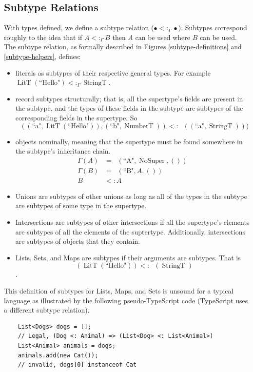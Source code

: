 \documentclass[12pt]{article}
\DeclareMathOperator{\StringT}{StringT}
\DeclareMathOperator{\NumberT}{NumberT}
\DeclareMathOperator{\LitT}{LitT}
\DeclareMathOperator{\RecT}{RecT_\Gamma}
\DeclareMathOperator{\ObjT}{ObjT_\Gamma}
\DeclareMathOperator{\ListT}{ListT_\Gamma}
\DeclareMathOperator{\NoSuper}{NoSuper}
\newcommand{\subtype}{<:_\Gamma}
\newcommand{\textq}[1]{\text{``#1"}}
\begin{document}
\subsection{Subtype Relations}

With types defined, we define a subtype 
relation (\(\bullet\subtype\bullet\)). Subtypes correspond 
roughly to the idea that if \(A\subtype B\) then \(A\)
can be used where \(B\) can be used. The subtype relation,
as formally described in Figures \ref{subtype-definitions} and \ref{subtype-helpers}, 
defines: 
\begin{itemize}
    \item literals as subtypes of their respective general types.
For example \(\LitT(\text{``Hello"})\subtype\StringT\). 
    \item record subtypes structurally; that is, all the supertype's fields 
are present in the subtype, and the types of these fields in the subtype
are subtypes of the corresponding fields in the supertype. 
    So \[\RecT((\text{``a"}, \LitT(\text{``Hello"})), (\text{``b"}, \NumberT))
    <: \RecT((\text{``a"}, \StringT)))\]
    \item objects nominally, meaning that the supertype must be
found somewhere in the subtype's inheritance chain.
    \begin{align*}
        \Gamma(A) &= \ObjT(\textq{A}, \NoSuper, ()) \\
        \Gamma(B) &= \ObjT(\textq{B}, A, ()) \\
        B &<: A
    \end{align*}
    \item Unions are subtypes of other unions as long as all of the types in the 
subtype are subtypes of some type in the supertype.
    \item Intersections are subtypes of other intersections if 
    all the supertype's elements are subtypes of all the elements of the suptertype.
    Additionally, intersections are subtypes of objects that they contain.
    \item Lists, Sets, and Maps are subtypes if their arguments are subtypes. 
    That is \[\ListT(\LitT(\textq{Hello})) <: \ListT(\StringT)\].
\end{itemize}

This definition of subtypes for Lists, Maps, and Sets is unsound
for a typical language
as illustrated by the following pseudo-TypeScript code 
(TypeScript uses a different subtype relation).

\begin{verbatim}
    List<Dogs> dogs = [];
    // Legal, (Dog <: Animal) => (List<Dog> <: List<Animal>)
    List<Animal> animals = dogs; 
    animals.add(new Cat()); 
    // invalid, dogs[0] instanceof Cat
\end{verbatim}
\end{document}
